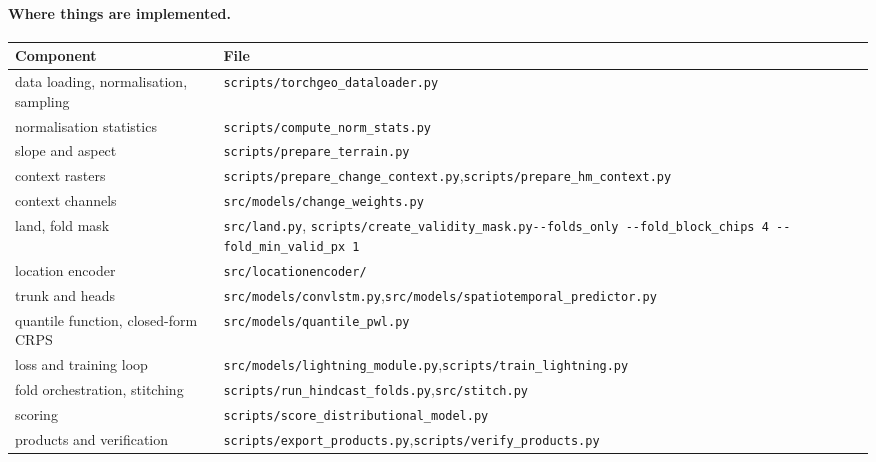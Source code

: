 \documentclass[11pt,a4paper]{article}
\newcommand{\code}[1]{\texttt{\small #1}}
\begin{document}
\paragraph{Where things are implemented.}
\begin{center}\small
\begin{tabular}{@{}p{4.8cm}p{10.4cm}@{}}
\toprule
Component & File \\
\midrule
data loading, normalisation, sampling & \code{scripts/torchgeo\_dataloader.py} \\
normalisation statistics & \code{scripts/compute\_norm\_stats.py} \\
slope and aspect & \code{scripts/prepare\_terrain.py} \\
context rasters & \code{scripts/prepare\_change\_context.py},\newline \code{scripts/prepare\_hm\_context.py} \\
context channels & \code{src/models/change\_weights.py} \\
land, fold mask & \code{src/land.py}, \code{scripts/create\_validity\_mask.py}\newline \code{-{}-folds\_only -{}-fold\_block\_chips 4 -{}-fold\_min\_valid\_px 1} \\
location encoder & \code{src/locationencoder/} \\
trunk and heads & \code{src/models/convlstm.py},\newline \code{src/models/spatiotemporal\_predictor.py} \\
quantile function, closed-form CRPS & \code{src/models/quantile\_pwl.py} \\
loss and training loop & \code{src/models/lightning\_module.py},\newline \code{scripts/train\_lightning.py} \\
fold orchestration, stitching & \code{scripts/run\_hindcast\_folds.py},\newline \code{src/stitch.py} \\
scoring & \code{scripts/score\_distributional\_model.py} \\
products and verification & \code{scripts/export\_products.py},\newline \code{scripts/verify\_products.py} \\
\bottomrule
\end{tabular}
\end{center}
\end{document}
